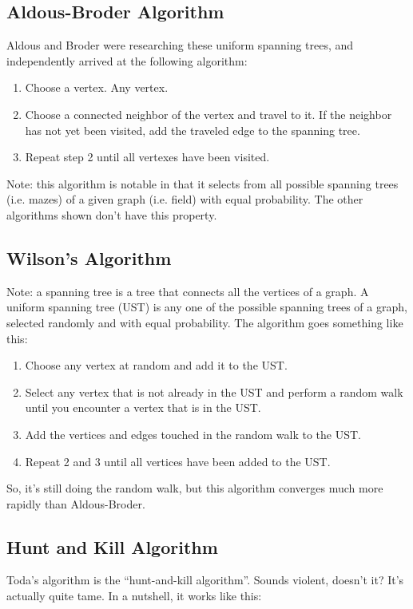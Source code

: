 \documentclass{article}
\begin{document}
\subsection{Aldous-Broder Algorithm}
Aldous and Broder were researching these uniform spanning trees, and independently arrived at the following algorithm:
\begin{enumerate}
    \item Choose a vertex. Any vertex.
    \item Choose a connected neighbor of the vertex and travel to it. If the neighbor has not yet been visited, add the traveled edge to the spanning tree.
    \item Repeat step 2 until all vertexes have been visited.
\end{enumerate}

Note: this algorithm is notable in that it selects from all possible spanning trees (i.e. mazes) of a given graph (i.e. field) with equal probability. The other algorithms shown don't have this property.

\subsection{Wilson's Algorithm}
Note: a spanning tree is a tree that connects all the vertices of a graph. A uniform spanning tree (UST) is any one of the possible spanning trees of a graph, selected randomly and with equal probability.
The algorithm goes something like this:
\begin{enumerate}
    \item Choose any vertex at random and add it to the UST.
    \item Select any vertex that is not already in the UST and perform a random walk until you encounter a vertex that is in the UST.
    \item Add the vertices and edges touched in the random walk to the UST.
    \item Repeat 2 and 3 until all vertices have been added to the UST.
\end{enumerate}

So, it's still doing the random walk, but this algorithm converges much more rapidly than Aldous-Broder.
\subsection{Hunt and Kill Algorithm}
Toda's algorithm is the “hunt-and-kill algorithm”. Sounds violent, doesn't it? It's actually quite tame. In a nutshell, it works like this:
\end{document}
